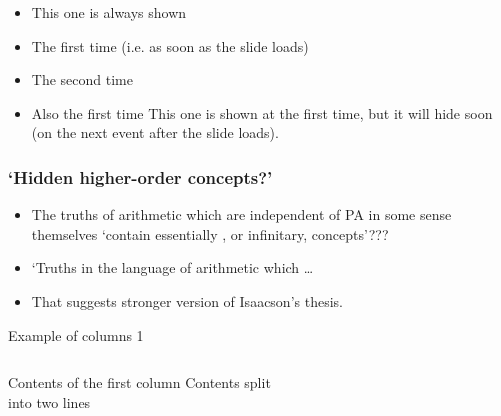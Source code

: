 \documentclass[10pt]{beamer}
\begin{document}
\begin{frame}
\begin{itemize}
  \item This one is always shown
  \item<1-> The first time (i.e. as soon as the slide loads)
  \item<2-> The second time
  \item<1-> Also the first time
   {This one is shown at the first time, but it will hide soon (on the next event after the slide loads).}
\end{itemize}
\end{frame}
\begin{frame}
  \frametitle{`Hidden higher-order concepts?'}
  \begin{itemize}[<+->]
  \item The truths of arithmetic which are independent of PA in some 
  sense themselves `{contain} essentially {\color{blue}{hidden higher-order}},
   or infinitary, concepts'???
  \item `Truths in the language of arithmetic which \ldots
  \item That suggests stronger version of Isaacson's thesis. 
  \end{itemize}
\end{frame}




\begin{frame}{Example of columns 1}
    \begin{columns}[c] %
     Contents of the first column
     Contents split \\ into two lines
    \end{columns}
\end{frame}
\end{document}
